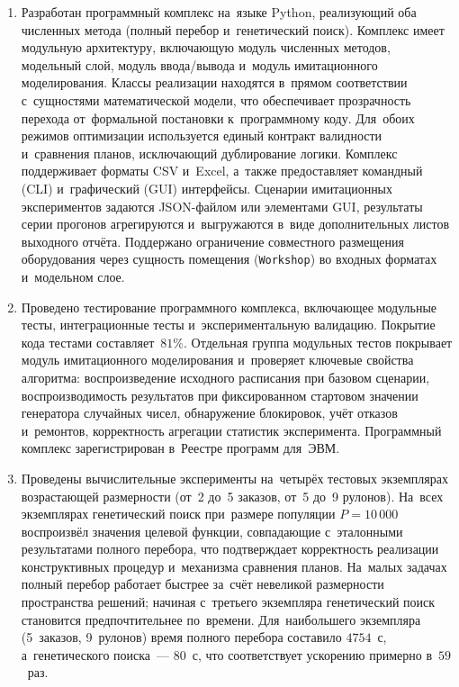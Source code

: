 \begin{enumerate}
  \item Разработан программный комплекс на~языке Python, реализующий оба численных метода (полный перебор и~генетический поиск).
  Комплекс имеет модульную архитектуру, включающую модуль численных методов, модельный слой, модуль ввода/вывода и~модуль имитационного моделирования.
  Классы реализации находятся в~прямом соответствии с~сущностями математической модели, что обеспечивает прозрачность перехода от~формальной постановки к~программному коду.
  Для~обоих режимов оптимизации используется единый контракт валидности и~сравнения планов, исключающий дублирование логики.
  Комплекс поддерживает форматы CSV и~Excel, а~также предоставляет командный (CLI) и~графический (GUI) интерфейсы.
  Сценарии имитационных экспериментов задаются JSON-файлом или элементами GUI, результаты серии прогонов агрегируются и~выгружаются в~виде дополнительных листов выходного отчёта. Поддержано ограничение совместного размещения оборудования через сущность помещения (\texttt{Workshop}) во входных форматах и~модельном слое.

  \item Проведено тестирование программного комплекса, включающее модульные тесты, интеграционные тесты и~экспериментальную валидацию.
  Покрытие кода тестами составляет~$81\%$.
  Отдельная группа модульных тестов покрывает модуль имитационного моделирования и~проверяет ключевые свойства алгоритма: воспроизведение исходного расписания при базовом сценарии, воспроизводимость результатов при фиксированном стартовом значении генератора случайных чисел, обнаружение блокировок, учёт отказов и~ремонтов, корректность агрегации статистик эксперимента.
  Программный комплекс зарегистрирован в~Реестре программ для~ЭВМ.

  \item Проведены вычислительные эксперименты на~четырёх тестовых экземплярах возрастающей размерности (от~2 до~5 заказов, от~5 до~9 рулонов).
  На~всех экземплярах генетический поиск при~размере популяции $P=10\,000$ воспроизвёл значения целевой функции, совпадающие с~эталонными результатами полного перебора, что подтверждает корректность реализации конструктивных процедур и~механизма сравнения планов.
  На~малых задачах полный перебор работает быстрее за~счёт невеликой размерности пространства решений; начиная с~третьего экземпляра генетический поиск становится предпочтительнее по~времени.
  Для~наибольшего экземпляра (5~заказов, 9~рулонов) время полного перебора составило $4754$~с, а~генетического поиска~--- $80$~с, что соответствует ускорению примерно в~$59$~раз.


\end{enumerate}
